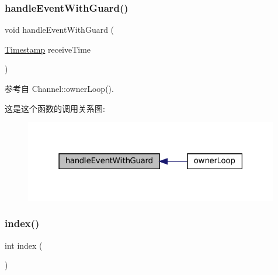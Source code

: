 \mbox{\label{classmuduo_1_1net_1_1Channel_a5af6a03aff8712d6b8276358c4ce604c}} 
\subsubsection{\texorpdfstring{handle\+Event\+With\+Guard()}{handleEventWithGuard()}}
{\footnotesize\ttfamily void handle\+Event\+With\+Guard (\begin{DoxyParamCaption}\item[{\hyperlink{classmuduo_1_1Timestamp}{Timestamp}}]{receive\+Time }\end{DoxyParamCaption})\hspace{0.3cm}{\ttfamily [private]}}



参考自 Channel\+::owner\+Loop().

这是这个函数的调用关系图\+:
\nopagebreak
\begin{figure}[H]
\begin{center}
\leavevmode
\includegraphics[width=315pt]{classmuduo_1_1net_1_1Channel_a5af6a03aff8712d6b8276358c4ce604c_icgraph}
\end{center}
\end{figure}
\mbox{\label{classmuduo_1_1net_1_1Channel_a019749328da42c4814af71d3e3b647ad}} 
\subsubsection{\texorpdfstring{index()}{index()}}
{\footnotesize\ttfamily int index (\begin{DoxyParamCaption}{ }\end{DoxyParamCaption})\hspace{0.3cm}{\ttfamily [inline]}}



